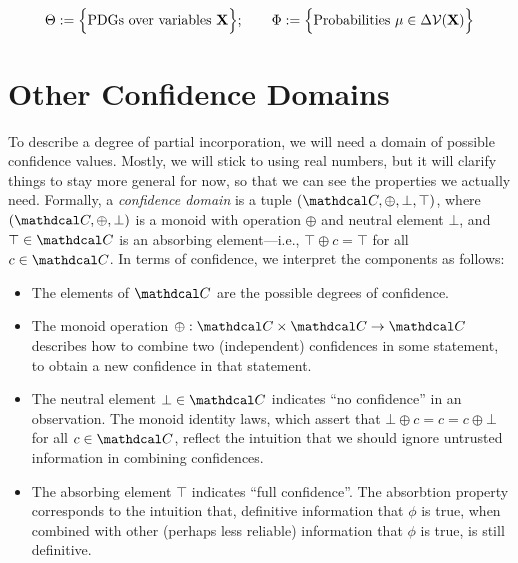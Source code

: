 \documentclass{article}
\def\confdom{\mathdcal C}
\begin{document}
\subsubsection{}
\begin{align*}
    \Theta :=
        \Big\{
        \text{PDGs over variables } \mathbf{X}
        \Big\}; \qquad
    \Phi := \Big\{
        \text{Probabilities}~ \mu \in \Delta \mathcal V(\mathbf{X})
        \Big\}
\end{align*}


\section{Other Confidence Domains}

To describe a degree of partial incorporation, we will need a domain of possible confidence values.
Mostly, we will stick to using real numbers, but it will clarify things to stay more general for now, so that we can see the properties we actually need. 
Formally, a \emph{confidence domain} is a tuple $(\confdom, \oplus, \bot, \top)$, 
where $(\confdom, \oplus, \bot)$ is a monoid with operation $\oplus$ and neutral element $\bot$, and $\top \in \confdom$ is an absorbing element---i.e., $\top \oplus c = \top$ for all $c \in \confdom$.
In terms of confidence, we interpret the components as follows:

\begin{itemize}%
    \item
    The elements of $\confdom$ are the possible degrees of confidence.

    \item
    The monoid operation $\oplus : \confdom \times \confdom \to \confdom$ describes how to combine two (independent) confidences in some statement, to obtain a new confidence in that statement.     

    \item The neutral element $\bot \in \confdom$ indicates ``no confidence'' in an observation.
    The monoid identity laws, which assert that
        $\bot \oplus c = c = c \oplus \bot$ for all $c \in \confdom$,
    reflect the intuition that we should ignore untrusted information in combining confidences.
    \item The absorbing element $\top$ indicates ``full confidence''.
    The absorbtion property corresponds to the intuition that, definitive information that $\phi$ is true, when combined with other (perhaps less reliable) information that $\phi$ is true, is still definitive.
\end{itemize}
\end{document}
